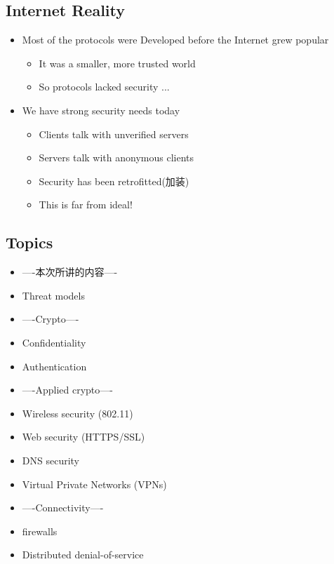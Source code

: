 \documentclass[12pt]{ctexart}   %
\begin{document}
	\subsection{Internet Reality}
	\begin{itemize}
		\item Most of the protocols were Developed before the Internet grew popular
		\begin{itemize}
			\item It was a smaller, more trusted world
			\item So protocols lacked security ...
		\end{itemize}

		\item  We have strong security needs today
		\begin{itemize}
			\item Clients talk with unverified servers
			\item Servers talk with anonymous clients
			\item Security has been retrofitted(加装)
			\item This is far from ideal!
		\end{itemize}
	\end{itemize}

	\subsection{Topics}
	\begin{itemize}
		\item {\color{red} ----本次所讲的内容----}
		\item Threat models
		
		\item {\color{red} ----Crypto----}
		\item Confidentiality
		\item Authentication
		
		\item {\color{red} ----Applied crypto----}
		\item Wireless security (802.11)
		\item Web security (HTTPS/SSL)
		\item DNS security
		\item Virtual Private Networks (VPNs)
		
		\item {\color{red} ----Connectivity----}
		\item firewalls
		\item Distributed denial-of-service
	\end{itemize}
\end{document}
